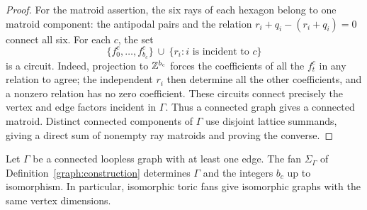 \begin{proof}
For the matroid assertion, the six rays of each hexagon belong to one
matroid component: the antipodal pairs and the relation
$r_i+q_i-(r_i+q_i)=0$ connect all six.  For each $c$, the set
\[
 \{f^c_0,\ldots,f^c_{b_c}\}\ \cup\ \{r_i:i\text{ is incident to }c\}
\]
is a circuit.  Indeed, projection to $\mathbb{Z}^{b_c}$ forces the
coefficients of all the $f^c_t$ in any relation to agree; the independent
$r_i$ then determine all the other coefficients, and a nonzero relation
has no zero coefficient. These circuits connect precisely the vertex
and edge factors incident in $\Gamma$. Thus a connected graph gives a
connected matroid.  Distinct connected components of $\Gamma$ use
disjoint lattice summands, giving a direct sum of nonempty ray
matroids and proving the converse.
\end{proof}

\begin{lemma}\label{graph:reconstruction}
Let $\Gamma$ be a connected loopless graph with at least one edge.
The fan $\Sigma_\Gamma$ of Definition~\ref{graph:construction}
determines $\Gamma$ and the integers $b_c$ up to isomorphism.
In particular, isomorphic toric fans give isomorphic graphs with the
same vertex dimensions.
\end{lemma}

